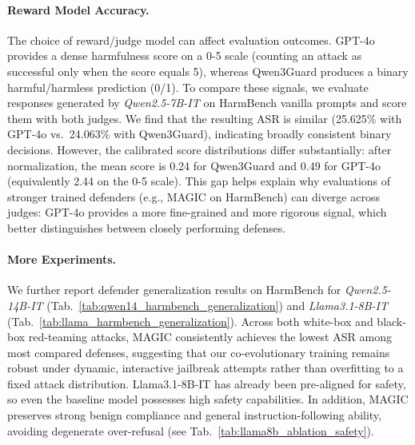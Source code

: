 \documentclass[11pt, letterpaper]{template}
\theoremstyle{plain}
\theoremstyle{definition}
\theoremstyle{remark}
\begin{document}
\paragraph{Reward Model Accuracy.} \label{pgh:reward_accuracy}
The choice of reward/judge model can affect evaluation outcomes. GPT-4o provides a dense harmfulness score on a 0-5 scale (counting an attack as successful only when the score equals 5), whereas Qwen3Guard produces a binary harmful/harmless prediction (0/1). To compare these signals, we evaluate responses generated by \textit{Qwen2.5-7B-IT} on HarmBench vanilla prompts and score them with both judges. We find that the resulting ASR is similar (25.625\% with GPT-4o vs.\ 24.063\% with Qwen3Guard), indicating broadly consistent binary decisions. However, the calibrated score distributions differ substantially: after normalization, the mean score is 0.24 for Qwen3Guard and 0.49 for GPT-4o (equivalently 2.44 on the 0-5 scale). This gap helps explain why evaluations of stronger trained defenders (e.g., MAGIC on HarmBench) can diverge across judges: GPT-4o provides a more fine-grained and more rigorous signal, which better distinguishes between closely performing defenses.



\paragraph{More Experiments.}

We further report defender generalization results on HarmBench for \textit{Qwen2.5-14B-IT} (Tab.~\ref{tab:qwen14_harmbench_generalization}) and \textit{Llama3.1-8B-IT} (Tab.~\ref{tab:llama_harmbench_generalization}). Across both white-box and black-box red-teaming attacks, MAGIC consistently achieves the lowest ASR among most compared defenses, suggesting that our co-evolutionary training remains robust under dynamic, interactive jailbreak attempts rather than overfitting to a fixed attack distribution. Llama3.1-8B-IT has already been pre-aligned for safety, so even the baseline model possesses high safety capabilities. In addition, MAGIC preserves strong benign compliance and general instruction-following ability, avoiding degenerate over-refusal (see Tab.~\ref{tab:llama8b_ablation_safety}).
\end{document}
